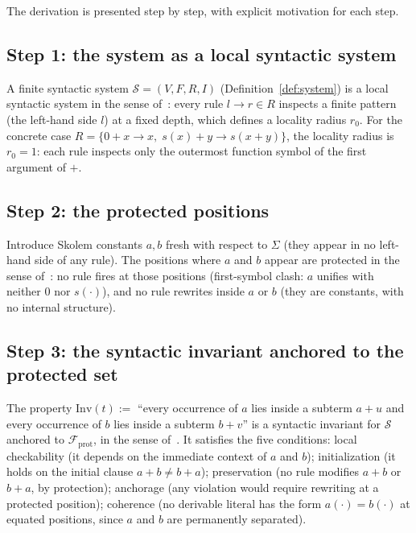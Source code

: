 \documentclass[11pt]{article}
\begin{document}
The derivation is presented step by step, with explicit motivation for
each step.

\subsection{Step 1: the system as a local syntactic system}

A finite syntactic system $\mathcal{S} = (V, F, R, I)$
(Definition~\ref{def:system}) is a local syntactic system in the sense
of~\cite[Definition~3.1]{buono2026obstruction}: every rule $l \to r \in R$
inspects a finite pattern (the left-hand side $l$) at a fixed depth,
which defines a locality radius $r_0$. For the concrete case
$R = \{0 + x \to x,\; s(x) + y \to s(x+y)\}$, the locality radius is
$r_0 = 1$: each rule inspects only the outermost function symbol of the
first argument of $+$.

\subsection{Step 2: the protected positions}

Introduce Skolem constants $a, b$ fresh with respect to $\Sigma$ (they
appear in no left-hand side of any rule). The positions where $a$ and
$b$ appear are protected in the sense
of~\cite[Definition~3.5]{buono2026obstruction}: no rule fires at those
positions (first-symbol clash: $a$ unifies with neither $0$ nor
$s(\cdot)$), and no rule rewrites inside $a$ or $b$ (they are constants,
with no internal structure).

\subsection{Step 3: the syntactic invariant anchored to the protected set}

The property $\mathrm{Inv}(t) :=$ ``every occurrence of $a$ lies inside
a subterm $a + u$ and every occurrence of $b$ lies inside a subterm
$b + v$'' is a syntactic invariant for $\mathcal{S}$ anchored to
$\mathcal{F}_{\mathrm{prot}}$, in the sense
of~\cite[Definition~3.8]{buono2026obstruction}. It satisfies the five
conditions: local checkability (it depends on the immediate context of
$a$ and $b$); initialization (it holds on the initial clause
$a + b \neq b + a$); preservation (no rule modifies $a + b$ or $b + a$,
by protection); anchorage (any violation would require rewriting at a
protected position); coherence (no derivable literal has the form
$a(\cdot) = b(\cdot)$ at equated positions, since $a$ and $b$ are
permanently separated).
\end{document}
